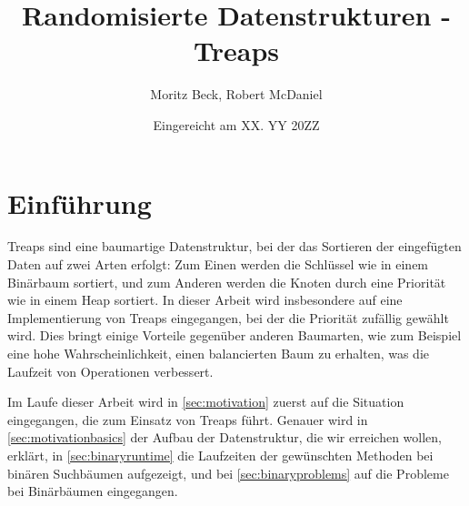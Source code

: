 \documentclass[a4paper]{scrreprt}
\theoremstyle{definition}
\begin{document}


\subject{Seminararbeit} %
\title{Randomisierte Datenstrukturen - Treaps} %
\author{Moritz Beck, Robert McDaniel} %
\date{Eingereicht am XX. YY 20ZZ} %
\titlehead{Julius-Maximilians-Universität Würzburg\\
Institut für Informatik\\
Lehrstuhl für Informatik I\\
Effiziente Algorithmen und wissensbasierte Systeme}
\publishers{Betreuer:\\
Prof.\ Dr.\ Alexander Wolff\\
Dipl.-Inf.\ Phillip Kindermann} %
\maketitle
\tableofcontents


\chapter{Einführung}
\label{sec:intro}

Treaps sind eine baumartige Datenstruktur, bei der das Sortieren der eingefügten Daten auf zwei Arten erfolgt: Zum Einen werden die Schlüssel wie in einem Binärbaum sortiert, und zum Anderen werden die Knoten durch eine Priorität wie in einem Heap sortiert. In dieser Arbeit wird insbesondere auf eine Implementierung von Treaps eingegangen, bei der die Priorität zufällig gewählt wird. Dies bringt einige Vorteile gegenüber anderen Baumarten, wie zum Beispiel eine hohe Wahrscheinlichkeit, einen balancierten Baum zu erhalten, was die Laufzeit von Operationen verbessert.

Im Laufe dieser Arbeit wird in \ref{sec:motivation} zuerst auf die Situation eingegangen, die zum Einsatz von Treaps führt. Genauer wird in \ref{sec:motivationbasics} der Aufbau der Datenstruktur, die wir erreichen wollen, erklärt, in \ref{sec:binaryruntime} die Laufzeiten der gewünschten Methoden bei binären Suchbäumen aufgezeigt, und bei \ref{sec:binaryproblems} auf die Probleme bei Binärbäumen eingegangen.
\end{document}
